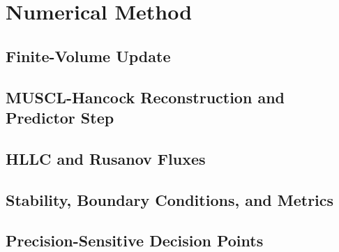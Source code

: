 
\chapter{Numerical Method}


\section{Finite-Volume Update}

\section{MUSCL-Hancock Reconstruction and Predictor Step}

\section{HLLC and Rusanov Fluxes}

\section{Stability, Boundary Conditions, and Metrics}

\section{Precision-Sensitive Decision Points}
